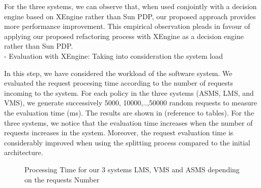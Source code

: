 For the three systems, we can observe that, when used conjointly with a decision engine based on XEngine rather than Sun PDP, our proposed approach 
provides more performance improvement. This empirical observation pleads in favour of applying our proposed refactoring process with XEngine as a decision engine rather than Sun PDP.\\
- Evaluation with XEngine: Taking into consideration the system load

In this step, we have considered the workload of the software system. We evaluated the request procesing time according to the number of requests incoming to the system. 
For each policy in the three systems (ASMS, LMS, and VMS), we generate successively 5000, 10000,..,50000 random requests to measure the evaluation time (ms).
The results are shown in (reference to tables). For the three systems, we notice that the evaluation time increases when the number of requests increases in the system. 
Moreover, the request evaluation time is considerably improved when using the splitting process compared to the initial architecture.
\begin{figure}
  \centering
  \caption{Processing Time for our 3 systems LMS, VMS and ASMS depending on the requests Number}
  \label{fig:processing time}
\end{figure}

